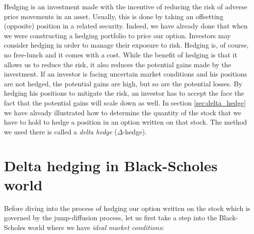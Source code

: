 \documentclass[times, utf8, diplomski]{fer}
\begin{document}
Hedging is an investment made with the incentive of reducing the risk of adverse price movements in an asset. Usually, this is done by taking an offsetting (opposite) position in a related security. Indeed, we have already done that when we were constructing a hedging portfolio to price our option. Investors may consider hedging in order to manage their exposure to risk. Hedging is, of course, no free-lunch and it comes with a cost. While the benefit of hedging is that it allows us to reduce the risk, it also reduces the potential gains made by the investment. If an investor is facing uncertain market conditions and his positions are not hedged, the potential gains are high, but so are the potential losses. By hedging his positions to mitigate the risk, an investor has to accept the face the fact that the potential gains will scale down as well. 
In section \ref{sec:delta_hedge} we have already illustrated how to determine the quantity of the stock that we have to hold to hedge a position in an option written on that stock. The method we used there is called a \textit{delta hedge} ($\Delta$-hedge). 

\section{Delta hedging in Black-Scholes world}
Before diving into the process of hedging our option written on the stock which is governed by the jump-diffusion process, let us first take a step into the Black-Scholes world where we have \textit{ideal market conditions}:
\end{document}
